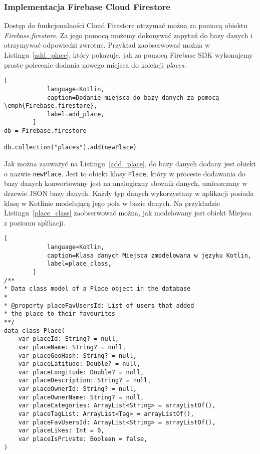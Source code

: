         \subsubsection{Implementacja Firebase Cloud Firestore}
        Dostęp do funkcjonalności Cloud Firestore otrzymać można za pomocą obiektu \emph{Firebase.firestore}. Za jego pomocą możemy dokonywać zapytań do bazy danych i otrzymywać odpowiedzi zwrotne.
        Przykład zaobserwować można w Listingu~\ref{add_place}, który pokazuje, jak za pomocą Firebase SDK wykonujemy proste polecenie dodania nowego miejsca do kolekcji \emph{places}.

        \vspace{1cm}
        \begin{lstlisting}[
            language=Kotlin, 
            caption=Dodanie miejsca do bazy danych za pomocą \emph{Firebase.firestore}, 
            label=add_place,
        ]
db = Firebase.firestore

db.collection("places").add(newPlace)
        \end{lstlisting}
        \vspace{1cm}

        Jak można zauważyć na Listingu~\ref{add_place}, do bazy danych dodany jest obiekt o nazwie \texttt{newPlace}. Jest to obiekt klasy \texttt{Place}, który w procesie dodawania do bazy danych konwertowany jest
        na analogiczny słownik danych, umieszczany w drzewie JSON bazy danych. Każdy typ danych wykorzystany w aplikacji posiada klasę w Kotlinie modelującą jego pola w bazie danych. Na przykładzie 
        Listingu~\ref{place_class} zaobserwować można, jak modelowany jest obiekt Miejsca z poziomu aplikacji.

        \vspace{0.5cm}
        \begin{lstlisting}[
            language=Kotlin, 
            caption=Klasa danych Miejsca zmodelowana w języku Kotlin, 
            label=place_class,
        ]
/**
* Data class model of a Place object in the database
*
* @property placeFavUsersId: List of users that added 
* the place to their favourites
**/
data class Place(
    var placeId: String? = null,
    var placeName: String? = null,
    var placeGeoHash: String? = null,
    var placeLatitude: Double? = null,
    var placeLongitude: Double? = null,
    var placeDescription: String? = null,
    var placeOwnerId: String? = null,
    var placeOwnerName: String? = null,
    var placeCategories: ArrayList<String> = arrayListOf(),
    var placeTagList: ArrayList<Tag> = arrayListOf(),
    var placeFavUsersId: ArrayList<String> = arrayListOf(),
    var placeLikes: Int = 0,
    var placeIsPrivate: Boolean = false,
)
        \end{lstlisting}
        \vspace{0.5cm}

